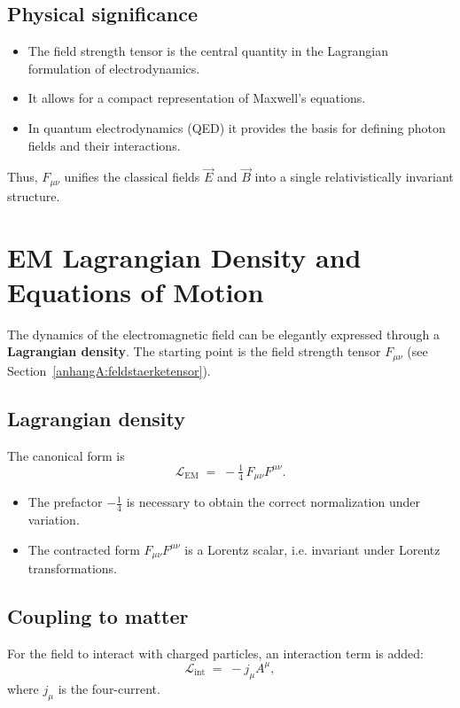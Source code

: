 \subsection*{Physical significance}
\begin{itemize}
	\item The field strength tensor is the central quantity in the 
	Lagrangian formulation of electrodynamics.
	\item It allows for a compact representation of Maxwell’s equations.
	\item In quantum electrodynamics (QED) it provides the basis 
	for defining photon fields and their interactions.
\end{itemize}

\medskip
Thus, \( F_{\mu\nu} \) unifies the classical fields \( \vec{E} \) and \( \vec{B} \)
into a single relativistically invariant structure.

\section{EM Lagrangian Density and Equations of Motion}
\label{anhangA:lagrange_em}

The dynamics of the electromagnetic field can be elegantly expressed 
through a \textbf{Lagrangian density}. 
The starting point is the field strength tensor \( F_{\mu\nu} \) 
(see Section~\ref{anhangA:feldstaerketensor}).

\subsection*{Lagrangian density}
The canonical form is
\[
\mathcal{L}_{\text{EM}} \;=\; -\tfrac{1}{4} \, F_{\mu\nu} F^{\mu\nu}.
\]

\begin{itemize}
	\item The prefactor \(-\tfrac{1}{4}\) is necessary to obtain the correct normalization 
	under variation.
	\item The contracted form \(F_{\mu\nu} F^{\mu\nu}\) 
	is a Lorentz scalar, i.e. invariant under Lorentz transformations.
\end{itemize}

\subsection*{Coupling to matter}
For the field to interact with charged particles, 
an interaction term is added:
\[
\mathcal{L}_{\text{int}} \;=\; - j_\mu A^\mu ,
\]
where \( j_\mu \) is the four-current.

